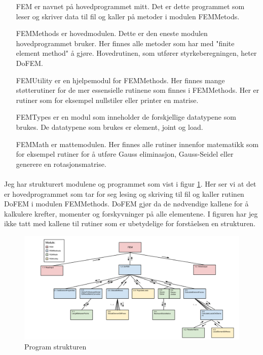 \documentclass[10pt,a4paper, norsk]{article}
\begin{document}
\begin{itemize}
\item[FEM] er navnet på hovedprogrammet mitt. Det er dette programmet som leser og skriver data til fil og kaller på metoder i modulen FEMMetods.
\item[FEMMethods] er hovedmodulen. Dette er den eneste modulen hovedprogrammet bruker. Her finnes alle metoder som har med "finite element method" å gjøre. Hovedrutinen, som utfører styrkeberegningen, heter DoFEM.
\item[FEMUtility] er en hjelpemodul for FEMMethods. Her finnes mange støtterutiner for de mer essensielle rutinene som finnes i FEMMethods. Her er rutiner som for eksempel nullstiler eller printer en matrise.
\item[FEMTypes] er en modul som inneholder de forskjellige datatypene som brukes. De datatypene som brukes er element, joint og load.
\item[FEMMath] er mattemodulen. Her finnes alle rutiner innenfor matematikk som for eksempel rutiner for å utføre Gauss eliminasjon, Gauss-Seidel eller generere en rotasjonsmatrise.
\end{itemize}

\paragraph*{}
Jeg har strukturert modulene og programmet som vist i figur \ref{fig:struktur}. Her ser vi at det er hovedprogrammet som tar for seg lesing og skriving til fil og kaller rutinen DoFEM i modulen FEMMethods. DoFEM gjør da de nødvendige kallene for å kalkulere krefter, momenter og forskyvninger på alle elementene. I figuren har jeg ikke tatt med kallene til rutiner som er ubetydelige for forståelsen en strukturen.

\begin{figure}[h]
\centering
\includegraphics[scale=0.31]{FEMAStructure.png} 
\caption{Program strukturen}
\label{fig:struktur}
\end{figure}
\end{document}
